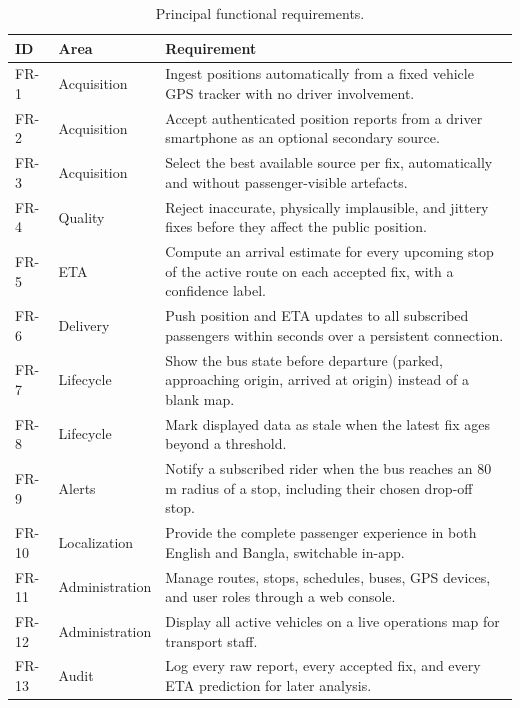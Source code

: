 \begin{table}[H]
\caption{Principal functional requirements.}
\label{tab:freq}
\centering
\small
\begin{tabular}{@{}llp{9.2cm}@{}}
\toprule
\textbf{ID} & \textbf{Area} & \textbf{Requirement} \\
\midrule
FR-1 & Acquisition & Ingest positions automatically from a fixed
vehicle GPS tracker with no driver involvement. \\
FR-2 & Acquisition & Accept authenticated position reports from a driver
smartphone as an optional secondary source. \\
FR-3 & Acquisition & Select the best available source per fix,
automatically and without passenger-visible artefacts. \\
FR-4 & Quality & Reject inaccurate, physically implausible, and
jittery fixes before they affect the public position. \\
FR-5 & ETA & Compute an arrival estimate for every upcoming stop of the
active route on each accepted fix, with a confidence label. \\
FR-6 & Delivery & Push position and ETA updates to all subscribed
passengers within seconds over a persistent connection. \\
FR-7 & Lifecycle & Show the bus state before departure (parked,
approaching origin, arrived at origin) instead of a blank map. \\
FR-8 & Lifecycle & Mark displayed data as stale when the latest fix ages
beyond a threshold. \\
FR-9 & Alerts & Notify a subscribed rider when the bus reaches an 80\,m
radius of a stop, including their chosen drop-off stop. \\
FR-10 & Localization & Provide the complete passenger experience in both
English and Bangla, switchable in-app. \\
FR-11 & Administration & Manage routes, stops, schedules, buses, GPS
devices, and user roles through a web console. \\
FR-12 & Administration & Display all active vehicles on a live
operations map for transport staff. \\
FR-13 & Audit & Log every raw report, every accepted fix, and every
ETA prediction for later analysis. \\
\bottomrule
\end{tabular}
\end{table}

